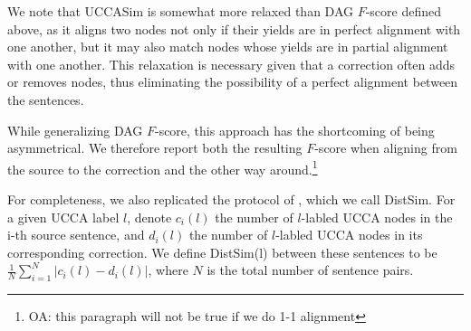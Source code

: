 \documentclass[letter,11pt]{article}
\newcommand{\oa}[1]{\footnote{\color{red}OA: #1}}
\begin{document}
We note that 
{\sc UCCASim} is somewhat more relaxed than DAG $F$-score defined above,
as it aligns two nodes not only if their yields are in perfect alignment with
one another, but it may also match nodes whose yields are in partial alignment
with one another. This relaxation is necessary given that a correction often adds
or removes nodes, thus eliminating the possibility of a perfect alignment between
the sentences. 


While generalizing DAG $F$-score, this approach has the shortcoming
of being asymmetrical. We therefore report both the resulting $F$-score when aligning
from the source to the correction and the other way around.\oa{this paragraph will not be
  true if we do 1-1 alignment}

For completeness, we also replicated the protocol of ,
which we call {\sc DistSim}.
For a given UCCA label $l$, denote $c_i(l)$ the number of $l$-labled UCCA nodes
in the i-th source sentence, and $d_i(l)$ the number of $l$-labled UCCA nodes
in its corresponding correction. We define {\sc DistSim}(l) between these
sentences to be $\frac{1}{N}\sum_{i=1}^N \vert c_i(l) - d_i(l) \vert$, where
$N$ is the total number of sentence pairs.


\end{document}
